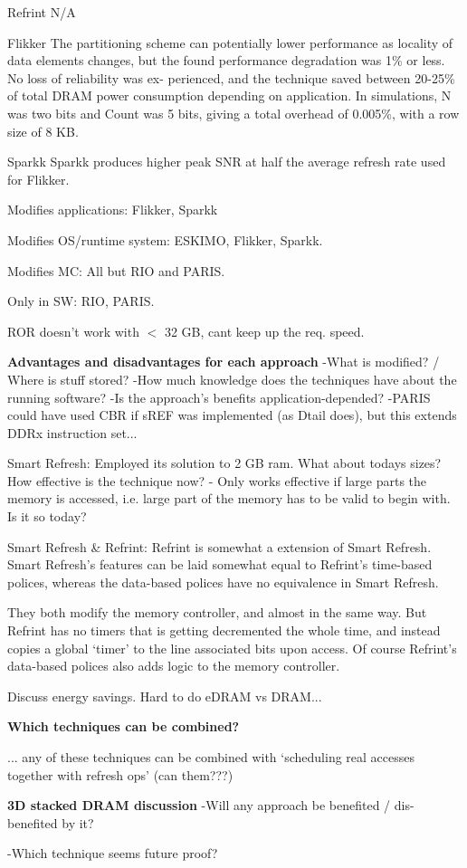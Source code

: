 Refrint
N/A

Flikker
The partitioning scheme can potentially lower performance as
locality of data elements changes, but the found performance
degradation was 1\% or less. No loss of reliability was ex-
perienced, and the technique saved between 20-25\% of total
DRAM power consumption depending on application.
In simulations, N was two bits and Count
was 5 bits, giving a total overhead of 0.005\%, with a row size
of 8 KB.

Sparkk
Sparkk produces higher peak SNR at half the
average refresh rate used for Flikker.


Modifies applications:
Flikker, Sparkk

Modifies OS/runtime system:
ESKIMO, Flikker, Sparkk.

Modifies MC:
All but RIO and PARIS.

Only in SW:
RIO, PARIS.

ROR doesn't work with $<$ 32 GB, cant keep up the req. speed.

\textbf{Advantages and disadvantages for each approach}
-What is modified? / Where is stuff stored?
-How much knowledge does the techniques have about the running software?
-Is the approach's benefits application-depended?
-PARIS could have used CBR if sREF was implemented (as Dtail does), but this extends DDRx instruction set...

Smart Refresh:
Employed its solution to 2 GB ram. What about todays sizes? How effective is the technique now? - Only works effective if large parts the memory is accessed, i.e. large part of the memory has to be valid to begin with. Is it so today?

Smart Refresh \& Refrint:
Refrint is somewhat a extension of Smart Refresh. Smart Refresh's features can be laid somewhat equal to Refrint's time-based polices, whereas the data-based polices have no equivalence in Smart Refresh.

They both modify the memory controller, and almost in the same way. But Refrint has no timers that is getting decremented the whole time, and instead copies a global `timer' to the line associated bits upon access. Of course Refrint's data-based polices also adds logic to the memory controller.

Discuss energy savings. Hard to do eDRAM vs DRAM...

\textbf{Which techniques can be combined?}

... any of these techniques can be combined with `scheduling real accesses together with refresh ops' (can them???)

\textbf{3D stacked DRAM discussion}
-Will any approach be benefited / dis-benefited by it?

-Which technique seems future proof?